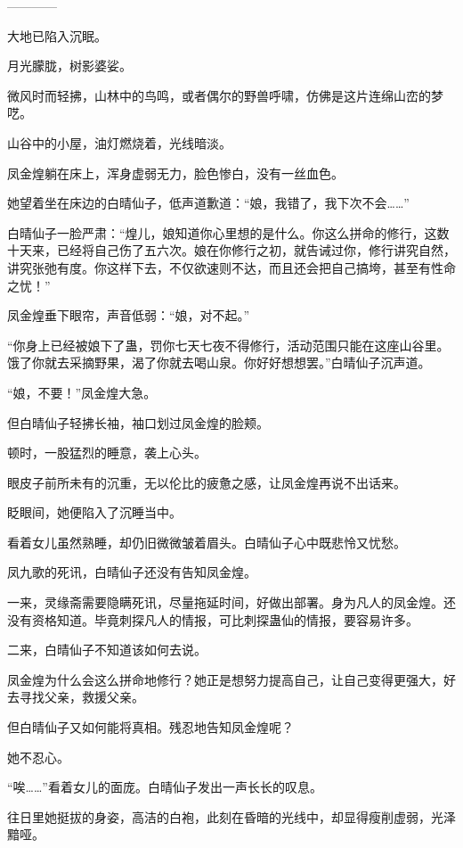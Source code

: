 
\begin{this_body}

------------

大地已陷入沉眠。

月光朦胧，树影婆娑。

微风时而轻拂，山林中的鸟鸣，或者偶尔的野兽呼啸，仿佛是这片连绵山峦的梦呓。

山谷中的小屋，油灯燃烧着，光线暗淡。

凤金煌躺在床上，浑身虚弱无力，脸色惨白，没有一丝血色。

她望着坐在床边的白晴仙子，低声道歉道：“娘，我错了，我下次不会……”

白晴仙子一脸严肃：“煌儿，娘知道你心里想的是什么。你这么拼命的修行，这数十天来，已经将自己伤了五六次。娘在你修行之初，就告诫过你，修行讲究自然，讲究张弛有度。你这样下去，不仅欲速则不达，而且还会把自己搞垮，甚至有性命之忧！”

凤金煌垂下眼帘，声音低弱：“娘，对不起。”

“你身上已经被娘下了蛊，罚你七天七夜不得修行，活动范围只能在这座山谷里。饿了你就去采摘野果，渴了你就去喝山泉。你好好想想罢。”白晴仙子沉声道。

“娘，不要！”凤金煌大急。

但白晴仙子轻拂长袖，袖口划过凤金煌的脸颊。

顿时，一股猛烈的睡意，袭上心头。

眼皮子前所未有的沉重，无以伦比的疲惫之感，让凤金煌再说不出话来。

眨眼间，她便陷入了沉睡当中。

看着女儿虽然熟睡，却仍旧微微皱着眉头。白晴仙子心中既悲怜又忧愁。

凤九歌的死讯，白晴仙子还没有告知凤金煌。

一来，灵缘斋需要隐瞒死讯，尽量拖延时间，好做出部署。身为凡人的凤金煌。还没有资格知道。毕竟刺探凡人的情报，可比刺探蛊仙的情报，要容易许多。

二来，白晴仙子不知道该如何去说。

凤金煌为什么会这么拼命地修行？她正是想努力提高自己，让自己变得更强大，好去寻找父亲，救援父亲。

但白晴仙子又如何能将真相。残忍地告知凤金煌呢？

她不忍心。

“唉……”看着女儿的面庞。白晴仙子发出一声长长的叹息。

往日里她挺拔的身姿，高洁的白袍，此刻在昏暗的光线中，却显得瘦削虚弱，光泽黯哑。


\end{this_body}
